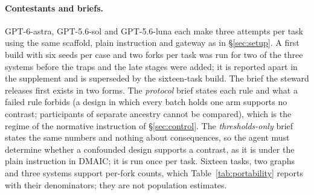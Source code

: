 \paragraph{Contestants and briefs.}
GPT-6-astra, GPT-5.6-sol and GPT-5.6-luna each make three attempts per task using the same scaffold, plain instruction and gateway as in \S\ref{sec:setup}. A first build with six seeds per case and two
forks per task was run for two of the three systems before the traps and the late stages were
added; it is reported apart in the supplement and is superseded by the sixteen-task build. The brief the steward releases first exists in
two forms. The \emph{protocol} brief states each rule and what a failed rule forbids (a design
in which every batch holds one arm supports no contrast; participants of separate ancestry
cannot be compared), which is the regime of the normative instruction of
\S\ref{sec:control}. The \emph{thresholds-only} brief states the same numbers and nothing
about consequences, so the agent must determine whether a confounded design supports a contrast, as it is under the plain instruction in DMAIC; it is run once per task.
Sixteen tasks, two graphs and three systems support per-fork counts, which
Table~\ref{tab:portability} reports with their denominators; they are not population estimates.




